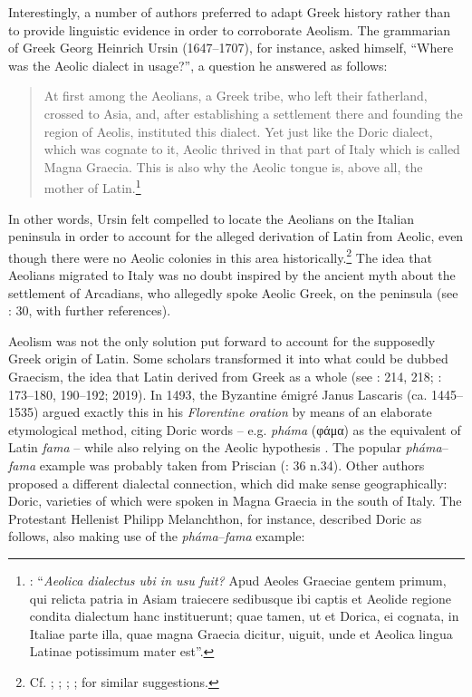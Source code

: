 Interestingly, a number of authors preferred to adapt Greek history rather than to provide linguistic evidence in order to corroborate Aeolism. The grammarian of Greek Georg Heinrich Ursin (1647–1707), for instance, asked himself, “Where was the Aeolic dialect in usage?”, a question he answered as follows:

\begin{quote}
At first among the Aeolians, a Greek tribe, who left their fatherland, crossed to Asia, and, after establishing a settlement there and founding the region of Aeolis, instituted this dialect. Yet just like the Doric dialect, which was cognate to it, Aeolic thrived in that part of Italy which is called Magna Graecia. This is also why the Aeolic tongue is, above all, the mother of Latin.\footnote{\citet[509]{Ursin1691}: “\textit{Aeolica dialectus ubi in usu fuit?} Apud Aeoles Graeciae gentem primum, qui relicta patria in Asiam traiecere sedibusque ibi captis et Aeolide regione condita dialectum hanc instituerunt; quae tamen, ut et Dorica, ei cognata, in Italiae parte illa, quae magna Graecia dicitur, uiguit, unde et Aeolica lingua Latinae potissimum mater est”.}
\end{quote}

In other words, Ursin felt compelled to locate the Aeolians on the Italian peninsula in order to account for the alleged derivation of Latin from Aeolic, even though there were no Aeolic colonies in this area historically.\footnote{Cf. \citet[289]{[schulze]1711}; \citet[\textsc{i}.69]{Ten1723}; \citet[30]{Munthe1748}; \citet[89]{Facius1782}; \citet[199]{Ries1786} for similar suggestions.} The idea that Aeolians migrated to Italy was no doubt inspired by the ancient myth about the settlement of Arcadians, who allegedly spoke Aeolic Greek, on the peninsula (see \citealt{Lamers2019}: 30, with further references).

Aeolism was not the only solution put forward to account for the supposedly Greek origin of Latin. Some scholars transformed it into what could be dubbed Graecism, the idea that Latin derived from Greek as a whole (see \citealt{Tavoni1986}: 214, 218; \citealt{Lamers2015}: 173–180, 190–192; 2019). In 1493, the Byzantine émigré Janus Lascaris (ca. 1445–1535) argued exactly this in his \textit{Florentine oration} by means of an elaborate etymological method, citing Doric words – e.g. \textit{pháma} (φάμα) as the equivalent of Latin \textit{fama} – while also relying on the Aeolic hypothesis \citep[179]{Lamers2015}. The popular \textit{pháma}–\textit{fama} example was probably taken from Priscian (\citealt{Lamers2019}: 36 n.34). Other authors proposed a different dialectal connection, which did make sense geographically: Doric, varieties of which were spoken in Magna Graecia in the south of Italy. The Protestant Hellenist Philipp Melanchthon, for instance, described Doric as follows, also making use of the \textit{pháma}–\textit{fama} example:

